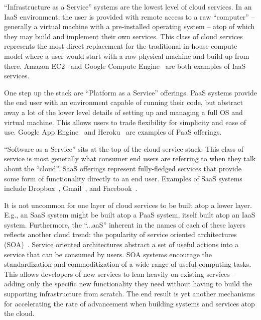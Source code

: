 \begin{packed_desc}
\item[IaaS:] ``Infrastructure as a Service'' systems are the lowest
  level of cloud services. In an IaaS environment, the user is
  provided with remote access to a raw ``computer'' -- generally a
  virtual machine with a pre-installed operating system -- atop of which
  they may build and implement their own services. This class of cloud
  services represents the most direct replacement for the traditional
  in-house compute model where a user would start with a raw physical
  machine and build up from there. Amazon EC2~\cite{amazon-ec2} and
  Google Compute Engine~\cite{google-compute} are both examples of IaaS
  services.
\item[PaaS:] One step up the stack are ``Platform as a Service''
  offerings. PaaS systems provide the end user with an environment
  capable of running their code, but abstract away a lot of the lower
  level details of setting up and managing a full OS and virtual
  machine. This allows users to trade flexibility for simplicity and
  ease of use. Google App Engine~\cite{google-appengine} and
  Heroku~\cite{heroku} are examples of PaaS offerings.
\item[SaaS:] ``Software as a Service'' sits at the top of the cloud
  service stack. This class of service is most generally what consumer
  end users are referring to when they talk about the ``cloud''. SaaS
  offerings represent fully-fledged services that provide some form of
  functionality directly to an end user. Examples of SaaS systems
  include Dropbox~\cite{dropbox}, Gmail~\cite{google-gmail}, and
  Facebook~\cite{facebook}.
\end{packed_desc}

It is not uncommon for one layer of cloud services to be built atop a
lower layer. E.g., an SaaS system might be built atop a PaaS system,
itself built atop an IaaS system. Furthermore, the ``...aaS'' inherent
in the names of each of these layers reflects another cloud trend: the
popularity of service oriented architectures
(SOA)~\cite{valipour2009}. Service oriented architectures abstract a
set of useful actions into a service that can be consumed by users.
SOA systems encourage the standardization and commoditization of a
wide range of useful computing tasks. This allows developers of new
services to lean heavily on existing services -- adding only the
specific new functionality they need without having to build the
supporting infrastructure from scratch. The end result is yet another
mechanisms for accelerating the rate of advancement when building
systems and services atop the cloud.

